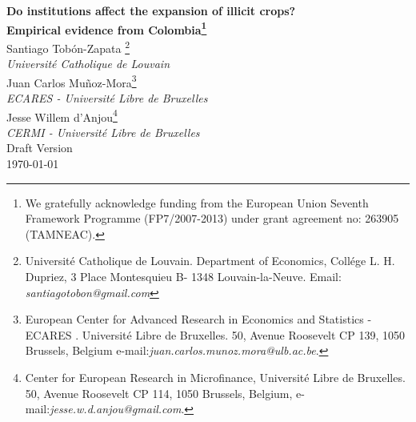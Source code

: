 
\graphicspath{{figures/}{/Users/jcmunozmora/Documents/data/Tobon-Munoz-Dagust/figures/}}




\begin{center}
\textbf{{\Huge Do institutions affect the expansion of illicit crops? } \\ \Large Empirical evidence from Colombia\footnote{We gratefully acknowledge funding from the European Union Seventh Framework Programme (FP7/2007-2013) under grant agreement no: 263905 (TAMNEAC).} }\\[0.5cm]

{\large Santiago Tob\'on-Zapata \footnote{ Universit\'e Catholique de Louvain. Department of Economics, Coll\'ege L. H. Dupriez, 3 Place Montesquieu B- 1348 Louvain-la-Neuve. Email: \textit{santiagotobon@gmail.com}} \\ \normalsize \textit{Universit\'e Catholique de Louvain}}\\[0.5cm]

{\large Juan Carlos Mu\~noz-Mora\footnote{European Center for Advanced Research in Economics and Statistics -ECARES . Universit\'e Libre de Bruxelles. 50, Avenue Roosevelt CP 139, 1050 Brussels, Belgium  e-mail:\textit{juan.carlos.munoz.mora@ulb.ac.be}.}  \\ \normalsize \textit{ECARES - Universit\'e Libre de Bruxelles}}\\[0.5cm]

{\large Jesse Willem d'Anjou\footnote{Center for European Research in Microfinance, Universit\'e Libre de Bruxelles. 50, Avenue Roosevelt CP 114, 1050 Brussels, Belgium, e-mail:\textit{jesse.w.d.anjou@gmail.com}.}  \\ \normalsize \textit{CERMI - Universit\'e Libre de Bruxelles}}\\[1.5cm]
{\large Draft Version }\\
\large \today 
\end{center}

